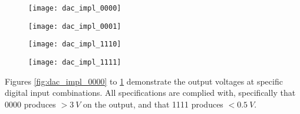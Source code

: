 \begin{figure}[!htb]
    \centering
    \begin{minipage}{.22\textwidth}
        \centering
        \texttt{[image: dac\_impl\_0000]}
        \label{fig:dac_impl_0000}
    \end{minipage}
    \begin{minipage}{.2\textwidth}
        \centering
        \texttt{[image: dac\_impl\_0001]}
        \label{fig:dac_impl_0001}
    \end{minipage}
    \begin{minipage}{.22\textwidth}
        \centering
        \texttt{[image: dac\_impl\_1110]}
        \label{fig:dac_impl_1110}
    \end{minipage}
    \begin{minipage}{.2\textwidth}
        \centering
        \texttt{[image: dac\_impl\_1111]}
        \label{fig:dac_impl_1111}
    \end{minipage}    
\end{figure}

Figures \ref{fig:dac_impl_0000} to \ref{fig:dac_impl_1111} demonstrate the output voltages at specific digital input combinations.
All specifications are complied with, specifically that 0000 produces $> \SI{3}{V}$ on the output, and that 1111 produces $< \SI{0.5}{V}$.